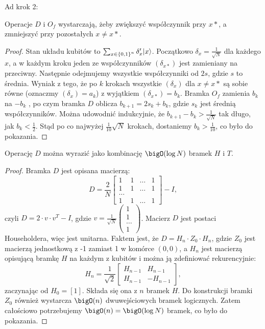 Ad krok 2:
\begin{proposition}
    Operacje \( D \) i \( O_f \) wystarczają, żeby zwiększyć współczynnik przy \( x* \), a zmniejszyć przy pozostałych \( x \neq x* \).
\end{proposition}
\begin{proof}
    Stan układu kubitów to \( \sum_{x \in \set{0,1}^n} \delta'_x |x\rangle \). Początkowo \( \delta_x = \frac{1}{\sqrt{N}} \) dla każdego \( x \),
    a w każdym kroku jeden ze współczynników \( (\delta_{x*}) \) jest zamieniany na przeciwny. Następnie odejmujemy wszystkie współczynniki od \( 2s \), gdzie \( s \) to średnia.
    Wyniak z tego, że po \( k \) krokach wszystkie \( (\delta_x) \) dla \( x \neq x* \) są sobie równe (oznaczmy \( (\delta_x) = a_k \)) z wyjątkiem \( (\delta_{x*}) = b_k \).
    Bramka \( O_f \) zamienia \( b_k \) na \( -b_k \) , po czym bramka \( D \) oblicza \( b_{k+1} = 2s_k + b_k \), gdzie \( s_k \) jest średnią współczynników.
    Można udowodnić indukcyjnie, że \( b_{k+1} - b_k > \frac{1}{\sqrt{N}} \) tak długo, jak \( b_k < \frac{1}{2} \).
    Stąd po co najwyżej \( \frac{1}{10} \sqrt{N} \) krokach, dostaniemy \( b_k > \frac{1}{10} \), co było do pokazania.
\end{proof}
\begin{proposition}
    Operację \( D \) można wyrazić jako kombinację \( \bigO(\log N) \) bramek \( H \) i \( T \).
\end{proposition}
\begin{proof}
    Bramka \( D \) jest opisana macierzą:
    \[
        D = \frac{2}{N}
        \begin{bmatrix}
        1 & 1 & \ldots & 1 \\
        1 & 1 & \ldots & 1 \\
        \ldots \\
        1 & 1 & \ldots & 1
        \end{bmatrix}
        - I,
    \]
    czyli \( D = 2 \cdot v \cdot v^T - I \), gdzie \( v = \frac{1}{\sqrt{N}}
    \begin{pmatrix}
    1 \\
    1 \\
    \ldots \\
    1
    \end{pmatrix} \).
    Macierz \( D \) jest postaci Householdera, więc jest unitarna. Faktem jest, że \( D = H_n \cdot Z_0 \cdot H_n \), gdzie \( Z_0 \) jest macierzą jednostkową z -1 zamiast 1 w komórce \( (0,0) \),
    a \( H_n \) jest macierzą opisującą bramkę \( H \) na każdym z kubitów i można ją zdefiniować rekurencyjnie:
    \[
        H_n = \frac{1}{\sqrt{2}}
        \begin{bmatrix}
        H_{n-1} & H_{n-1} \\
        H_{n-1} & -H_{n-1}
        \end{bmatrix},
    \]
    zaczynając od \( H_0 = [1] \). Składa się ona z \( n \) bramek \( H \). Do konstrukcji bramki \( Z_0 \) również wystarcza \( \bigO(n) \) dwuwejściowych bramek logicznych.
    Zatem całościowo potrzebujemy \( \bigO(n) = \bigO(\log N) \) bramek, co było do pokazania.
\end{proof}